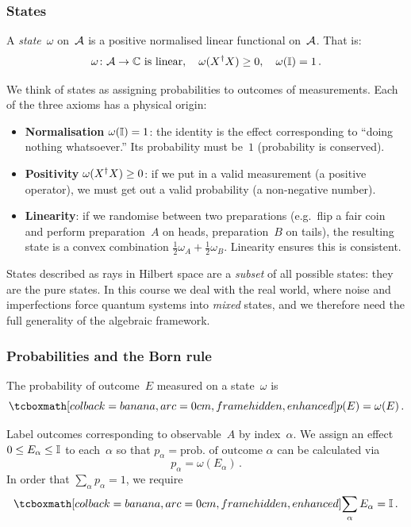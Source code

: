 \subsubsection{States}\label{sec:states}
A \emph{state}~$\omega$ on~$\mathcal{A}$ is a positive normalised linear
functional on~$\mathcal{A}$.  That is:
\begin{equation}\label{eq:state-def}
  \omega\colon \mathcal{A} \to \mathbb{C} \text{ is linear},\quad
  \omega(X^\dagger X) \geq 0,\quad
  \omega(\mathbb{I}) = 1\,.
\end{equation}

We think of states as assigning probabilities to outcomes of
measurements.  Each of the three axioms has a physical origin:
\begin{itemize}
  \item \textbf{Normalisation} $\omega(\mathbb{I}) = 1$: the identity is the
    effect corresponding to ``doing nothing whatsoever.''  Its
    probability must be~$1$ (probability is conserved).
  \item \textbf{Positivity} $\omega(X^\dagger X) \geq 0$: if we put in a
    valid measurement (a positive operator), we must get out a valid
    probability (a non-negative number).
  \item \textbf{Linearity}: if we randomise between two preparations
    (e.g.\ flip a fair coin and perform preparation~$A$ on heads,
    preparation~$B$ on tails), the resulting state is a convex
    combination $\tfrac{1}{2}\omega_A + \tfrac{1}{2}\omega_B$.
    Linearity ensures this is consistent.
\end{itemize}

\begin{remark}
  States described as rays in Hilbert space are a \emph{subset} of all
  possible states: they are the pure states.  In this course we deal
  with the real world, where noise and imperfections force quantum
  systems into \emph{mixed} states, and we therefore need the full
  generality of the algebraic framework.
\end{remark}

\subsubsection{Probabilities and the Born rule}
The probability of outcome~$E$ measured on a state~$\omega$ is
\begin{equation}\label{eq:born-rule}
  \eqbox{p(E) = \omega(E)}\,.
\end{equation}

Label outcomes corresponding to observable~$A$ by index~$\alpha$.
We assign an effect $0 \leq E_\alpha \leq \mathbb{I}$ to each~$\alpha$ so
that $p_\alpha = \text{prob.\ of outcome } \alpha$ can be calculated
via
\begin{equation}\label{eq:prob-outcome}
  p_\alpha = \omega(E_\alpha)\,.
\end{equation}
In order that $\sum_\alpha p_\alpha = 1$, we require
\begin{equation}\label{eq:povm-resolution}
  \eqbox{\sum_\alpha E_\alpha = \One}\,.
\end{equation}

